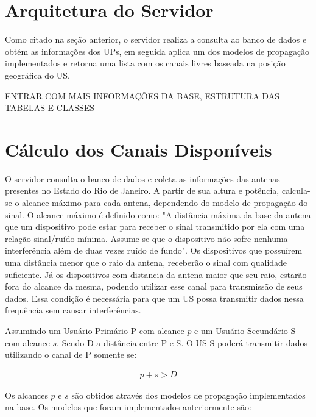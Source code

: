 \section{Arquitetura do Servidor}

Como citado na seção anterior, o servidor realiza a consulta ao banco de dados e obtém as informações dos UPs, em seguida aplica um dos modelos de propagação implementados e retorna uma lista com os canais livres baseada na posição geográfica do US.

ENTRAR COM MAIS INFORMAÇÕES DA BASE, ESTRUTURA DAS TABELAS E CLASSES

\section{Cálculo dos Canais Disponíveis}

O servidor consulta o banco de dados e coleta as informações das antenas presentes no Estado do Rio de Janeiro. A partir de sua altura e potência, calcula-se o alcance máximo para cada antena, dependendo do modelo de propagação do sinal. O alcance máximo é definido como: "A distância máxima da base da antena que um dispositivo pode estar para receber o sinal transmitido por ela com uma relação sinal/ruído mínima. Assume-se que o dispositivo não sofre nenhuma interferência além de duas vezes ruído de fundo". Os dispositivos que possuírem uma distância menor que o raio da antena, receberão o sinal com qualidade suficiente. Já os dispositivos com distancia da antena maior que seu raio, estarão fora do alcance da mesma, podendo utilizar esse canal para transmissão de seus dados. Essa condição é necessária para que um US possa transmitir dados nessa frequência sem causar interferências.

Assumindo um Usuário Primário P com alcance \begin{math}p\end{math} e um Usuário Secundário S com alcance \begin{math}s\end{math}. Sendo D a distância entre P e S. O US S poderá transmitir dados utilizando o canal de P somente se:

\begin{align}
  \label{cantransmitdata} p + s > D
\end{align}

Os alcances \begin{math} p \end{math} e \begin{math} s \end{math} são obtidos através dos modelos de propagação implementados na base. Os modelos que foram implementados anteriormente são: 


